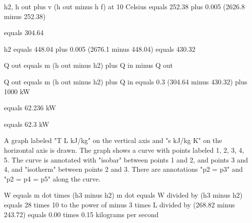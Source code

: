 h2, h out plus v (h out minus h f) at 10 Celsius equals 252.38 plus 0.005 (2626.8 minus 252.38)

equals 304.64

h2 equals 448.04 plus 0.005 (2676.1 minus 448.04) equals 430.32

Q out equals m (h out minus h2) plus Q in minus Q out

Q out equals m (h out minus h2) plus Q in equals 0.3 (304.64 minus 430.32) plus 1000 kW

equals 62.236 kW

equals 62.3 kW

A graph labeled "T L kJ/kg" on the vertical axis and "s kJ/kg K" on the horizontal axis is drawn. The graph shows a curve with points labeled 1, 2, 3, 4, 5. The curve is annotated with "isobar" between points 1 and 2, and points 3 and 4, and "isotherm" between points 2 and 3. There are annotations "p2 = p3" and "p2 = p4 = p5" along the curve.

W equals m dot times (h3 minus h2)  
m dot equals W divided by (h3 minus h2) equals 28 times 10 to the power of minus 3 times L divided by (268.82 minus 243.72) equals 0.00 times 0.15 kilograms per second